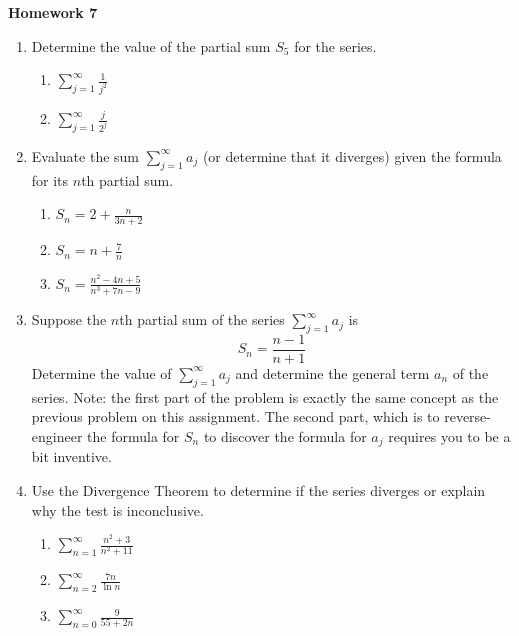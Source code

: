 \documentclass{article}
\begin{document}
\begin{center}
    \large \textbf{Homework 7}
\end{center}
                \begin{enumerate}
                    \item Determine the value of the partial sum $S_5$ for the series.
                        \begin{enumerate}
                            \item $\displaystyle \sum_{j=1}^\infty \frac{1}{j^2}$
                            \item $\displaystyle \sum_{j=1}^\infty \frac{j}{2^j}$
                        \end{enumerate}
                    \item Evaluate the sum $\displaystyle \sum_{j=1}^\infty a_j$ (or determine that it diverges) given the formula for its $n$th partial sum.
                        \begin{enumerate}
                            \item $\displaystyle S_n = 2+\frac{n}{3n+2}$
                            \item $\displaystyle S_n = n+\frac{7}{n}$
                            \item $\displaystyle S_n = \frac{n^2-4n+5}{n^3+7n-9}$
                        \end{enumerate}
                    \item Suppose the $n$th partial sum of the series $\displaystyle \sum_{j=1}^\infty a_j$ is $$S_n = \frac{n-1}{n+1}$$  Determine the value of $\displaystyle \sum_{j=1}^\infty a_j$ and determine the general term $a_n$ of the series. Note: the first part of the problem is exactly the same concept as the previous problem on this assignment. The second part, which is to reverse-engineer the formula for $S_n$ to discover the formula for $a_j$ requires you to be a bit inventive. 
                    \item Use the Divergence Theorem to determine if the series diverges or explain why the test is inconclusive.  
                        \begin{enumerate}
                            \item $\displaystyle \sum_{n=1}^\infty \frac{n^2+3}{n^2+11}$
                            \item $\displaystyle \sum_{n=2}^\infty \frac{7n}{\ln n}$
                            \item $\displaystyle \sum_{n=0}^\infty \frac{9}{55+2n}$

\end{enumerate}
\end{enumerate}
\end{document}
